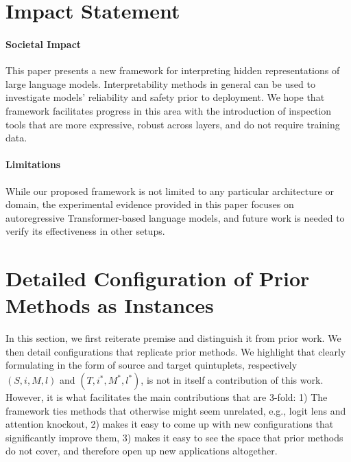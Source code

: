 \documentclass{article}
\theoremstyle{plain}
\theoremstyle{definition}
\theoremstyle{remark}
\begin{document}
\section*{Impact Statement}

\paragraph{Societal Impact}
This paper presents a new framework for interpreting hidden representations of large language models. Interpretability methods in general can be used to investigate models' reliability and safety prior to deployment. We hope that \methodFamilyName{} framework facilitates progress in this area with the introduction of inspection tools that are more expressive, robust across layers, and do not require training data.

\paragraph{Limitations} 
While our proposed framework is not limited to any particular architecture or domain, the experimental evidence provided in this paper focuses on autoregressive Transformer-based language models, and future work is needed to verify its effectiveness in other setups.





\newpage
\appendix
\onecolumn
\section{Detailed Configuration of Prior Methods as \methodName{} Instances}
\label{sec:method-configs}

In this section, we first reiterate \methodFamilyName{} premise and distinguish it from prior work. We then detail \methodName{} configurations that replicate prior methods. We highlight that clearly formulating \methodFamilyName{} in the form of source and target quintuplets, respectively $(S, i, M, l)$ and $(T, i^*, M^*, l^*)$, is not in itself a contribution of this work. However, it is what facilitates the main contributions that are 3-fold: 1) The framework ties methods that otherwise might seem unrelated, e.g., logit lens and attention knockout,  2) makes it easy to come up with new configurations that significantly improve them, 3) makes it easy to see the space that prior methods do not cover, and therefore open up new applications altogether.
\end{document}
